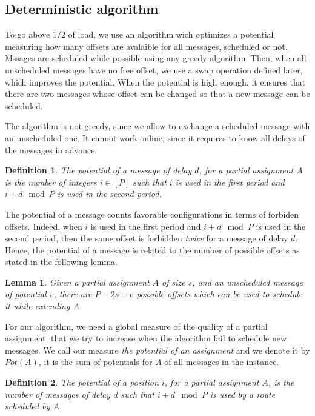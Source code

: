 \documentclass[10pt, conference, letterpaper]{IEEEtran}
\newtheorem{lemma}[theorem]{Lemma}
\newtheorem{definition}{Definition}
\begin{document}
\subsection{Deterministic algorithm}

To go above $1/2$ of load, we use an algorithm wich optimizes a potential measuring how many offsets are avalaible for all messages, scheduled or not. Mssages are scheduled while possible using any greedy algorithm.
Then, when all unscheduled messages have no free offset, we use a swap operation defined later, which improves the potential. When the potential is high enough, it ensures that there are two messages whose offset can be changed so that a new message can be scheduled. 

 The algorithm is not greedy, since we allow to exchange a scheduled message with an unscheduled one. It cannot work online, since it requires to know all delays of the messages in advance. 

\begin{definition}
The potential of a message of delay $d$, for a partial assignment $A$
is the number of integers $i \in [P]$ such that $i$ is used in the first period and $i+d \mod P$ is used in the second period.
\end{definition}

The potential of a message counts favorable configurations in terms of forbiden offsets.
Indeed, when $i$ is used in the first period and $i+d \mod P$ is used in the second period,
then the same offset is forbidden \emph{twice} for a message of delay $d$. Hence, the potential of a message is related to the number of possible offsets as stated in the following lemma. 

\begin{lemma}
Given a partial assignment $A$ of size $s$, and an unscheduled message of potential 
$v$, there are $P - 2s + v$ possible offsets which can be used to schedule it while extending $A$.
\end{lemma}

For our algorithm, we need a global measure of the quality of a partial assignment, 
that we try to increase when the algorithm fail to schedule new messages. 
We call our measure \emph{the potential of an assignment} and we denote it by $Pot(A)$, it is the sum of potentials for $A$ of all messages in the instance.


\begin{definition}
The potential of a position $i$, for a partial assignment $A$, is the number of messages of delay $d$ such that $i+d \mod P$ is used by a route scheduled by $A$. 
\end{definition}
\end{document}
